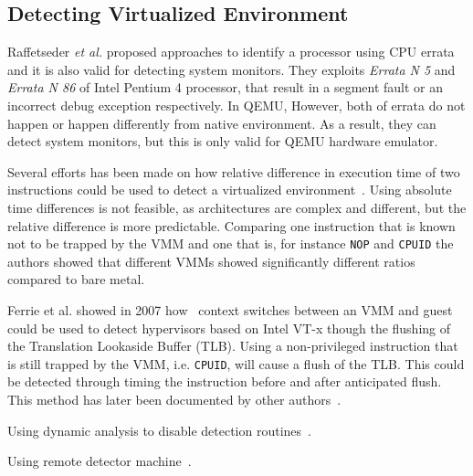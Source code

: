 \subsection{Detecting Virtualized Environment}
Raffetseder \textit{et al.} proposed approaches to identify a processor using CPU errata~\cite{raffetseder2007} and it is also valid for detecting system monitors. They exploits \textit{Errata N 5} and \textit{Errata N 86} of Intel Pentium 4 processor, that result in a segment fault or an incorrect debug exception respectively. In QEMU, However, both of errata do not happen or happen differently from native environment. As a result, they can detect system monitors, but this is only valid for QEMU hardware emulator.

Several efforts has been made on how relative difference in execution time of
two instructions could be used to detect a virtualized
environment~\cite{raffetseder2007, thompson}. Using absolute time differences is
not feasible, as architectures are complex and different, but the relative
difference is more predictable. Comparing one instruction that is known not to
be trapped by the VMM and one that is, for instance {\tt NOP} and {\tt CPUID}
the authors showed that different VMMs showed significantly different ratios
compared to bare metal.

Ferrie {et al.} showed in 2007 how~\cite{ferrie2007} context switches between an
VMM and guest could be used to detect hypervisors based on Intel VT-x though the
flushing of the Translation Lookaside Buffer (TLB). Using a non-privileged
instruction that is still trapped by the VMM, i.e. {\tt CPUID}, will cause a
flush of the TLB. This could be detected through timing the instruction before
and after anticipated flush. This method has later been documented by other
authors~\cite{thompson}.




Using dynamic analysis to disable detection routines~\cite{kang2009}.

Using remote detector machine~\cite{franklin2008}.

